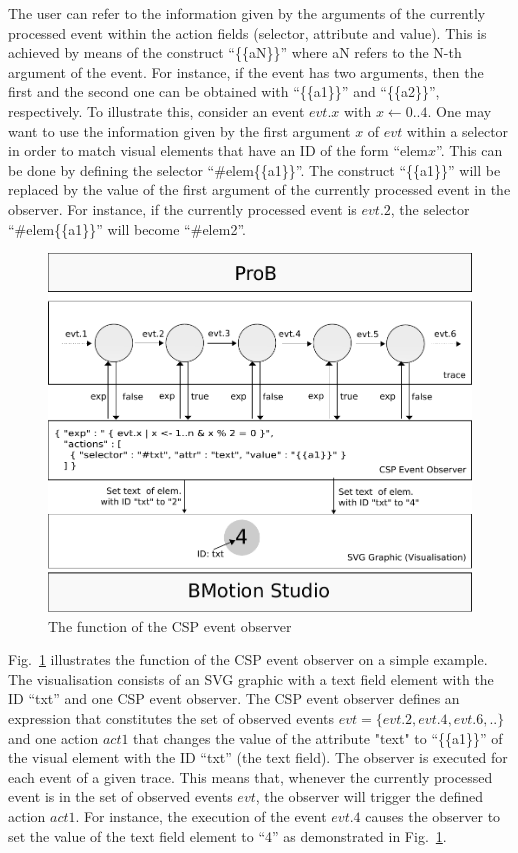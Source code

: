 The user can refer to the information given by the arguments of the currently processed event within the action fields (selector, attribute and value).
This is achieved by means of the construct ``\{\{aN\}\}'' where aN refers to the N-th argument of the event.
For instance, if the event has two arguments, then the first and the second one can be obtained with ``\{\{a1\}\}'' and ``\{\{a2\}\}'', respectively. 
To illustrate this, consider an event $evt.x$ with $x \leftarrow 0..4$.
One may want to use the information given by the first argument $x$ of $evt$ within a selector in order to match visual elements that have an ID of the form ``elem$x$''.
This can be done by defining the selector ``\#elem\{\{a1\}\}''.
The construct ``\{\{a1\}\}'' will be replaced by the value of the first argument of the currently processed event in the observer.
For instance, if the currently processed event is $evt.2$, the selector ``\#elem\{\{a1\}\}'' will become ``\#elem2''.

\begin{figure}[h!]\centering
	\includegraphics[width=14cm]{img/reference/detailprocess}
	\caption{The function of the CSP event observer}
	\label{fig:detailprocess}
\end{figure}

Fig.~\ref{fig:detailprocess} illustrates the function of the CSP event observer on a simple example.
The visualisation consists of an SVG graphic with a text field element with the ID ``txt'' and one CSP event observer.
The CSP event observer defines an expression that constitutes the set of observed events $evt = \{evt.2, evt.4, evt.6, ..\}$ and one action $act1$ that changes the value of the attribute "text" to ``\{\{a1\}\}'' of the visual element with the ID ``txt'' (the text field).
The observer is executed for each event of a given trace.
This means that, whenever the currently processed event is in the set of observed events $evt$, the observer will trigger the defined action $act1$.
For instance, the execution of the event $evt.4$ causes the observer to set the value of the text field element to ``4'' as demonstrated in Fig.~\ref{fig:detailprocess}.

